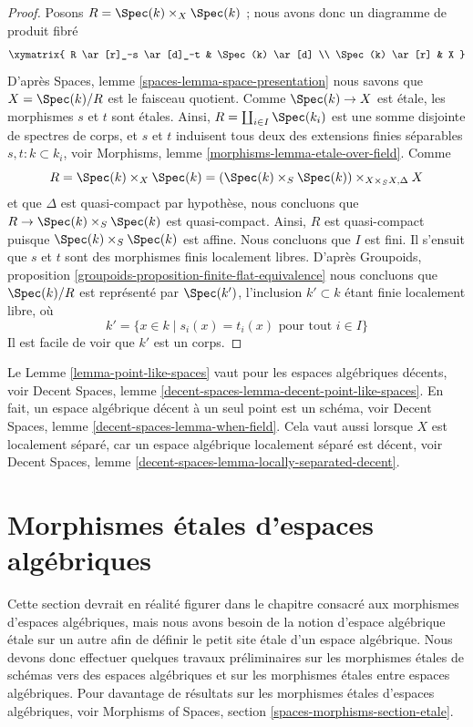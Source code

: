 \begin{proof}
Posons $R = \Spec(k) \times_X \Spec(k)$ ; nous avons donc un
diagramme de produit fibré
$$
\xymatrix{
R \ar[r]_-s \ar[d]_-t & \Spec(k) \ar[d] \\
\Spec(k) \ar[r] & X
}
$$
D'après
Spaces, lemme \ref{spaces-lemma-space-presentation}
nous savons que $X = \Spec(k)/R$ est le faisceau quotient.
Comme $\Spec(k) \to X$ est \'etale, les morphismes $s$ et $t$ sont
\'etales. Ainsi, $R = \coprod_{i \in I} \Spec(k_i)$ est une somme
disjointe de spectres de corps, et $s$ et $t$
induisent tous deux des extensions finies séparables $s, t : k \subset k_i$, voir
Morphisms, lemme \ref{morphisms-lemma-etale-over-field}.
Comme
$$
R = \Spec(k) \times_X \Spec(k)
= (\Spec(k) \times_S \Spec(k)) \times_{X \times_S X, \Delta} X
$$
et que $\Delta$ est quasi-compact par hypothèse, nous concluons que
$R \to \Spec(k) \times_S \Spec(k)$ est quasi-compact.
Ainsi, $R$ est quasi-compact puisque $\Spec(k) \times_S \Spec(k)$ est
affine. Nous concluons que $I$ est fini. Il s'ensuit
que $s$ et $t$ sont des morphismes finis localement libres. D'après
Groupoids, proposition \ref{groupoids-proposition-finite-flat-equivalence}
nous concluons que $\Spec(k)/R$ est
représenté par $\Spec(k')$, l'inclusion $k' \subset k$ étant finie localement libre,
où
$$
k' = \{x \in k \mid s_i(x) = t_i(x)\text{ pour tout }i \in I\}
$$
Il est facile de voir que $k'$ est un corps.
\end{proof}

\begin{remark}
\label{remark-cannot-decide-yet}
Le Lemme \ref{lemma-point-like-spaces} vaut pour les espaces algébriques décents, voir
Decent Spaces, lemme \ref{decent-spaces-lemma-decent-point-like-spaces}.
En fait, un espace algébrique décent à un seul point est un schéma, voir
Decent Spaces, lemme \ref{decent-spaces-lemma-when-field}.
Cela vaut aussi lorsque $X$ est localement séparé, car un
espace algébrique localement séparé est décent, voir
Decent Spaces, lemme \ref{decent-spaces-lemma-locally-separated-decent}.
\end{remark}







\section{Morphismes \'etales d'espaces algébriques}
\label{section-etale-morphisms}

\noindent
Cette section devrait en réalité figurer dans le chapitre consacré aux morphismes d'espaces
algébriques, mais nous avons besoin de la notion d'espace algébrique \'etale sur un autre
afin de définir le petit site \'etale d'un espace algébrique.
Nous devons donc effectuer quelques travaux préliminaires sur les morphismes \'etales de schémas vers des
espaces algébriques et sur les morphismes \'etales entre espaces algébriques.
Pour davantage de résultats sur les morphismes \'etales d'espaces algébriques, voir
Morphisms of Spaces, section \ref{spaces-morphisms-section-etale}.

